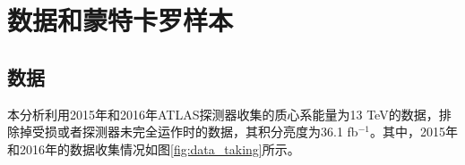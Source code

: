 \section{数据和蒙特卡罗样本}\label{chap:dataMC}

\subsection{数据}
本分析利用2015年和2016年ATLAS探测器收集的质心系能量为13 TeV的数据，排除掉受损或者探测器未完全运作时的数据，其积分亮度为36.1 fb$^{-1}$。其中，2015年和2016年的数据收集情况如图\ref{fig:data_taking}所示。



